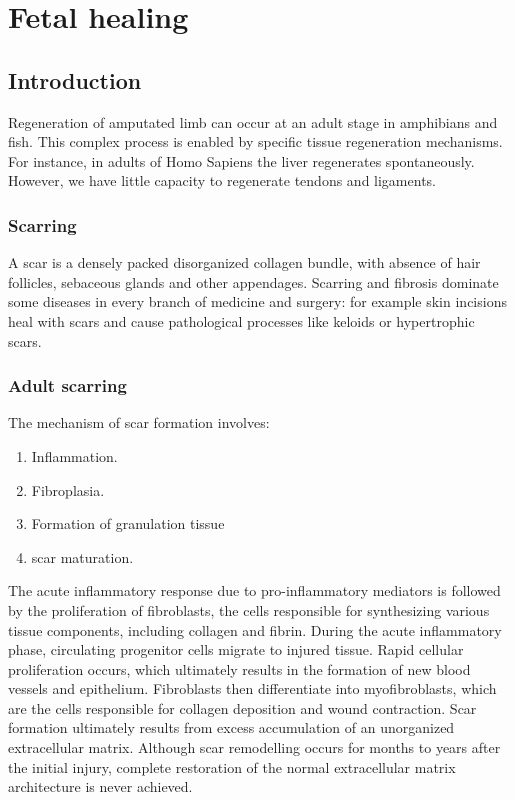 \graphicspath{{chapters/07/images/}}
\chapter{Fetal healing}

\section{Introduction}
Regeneration of amputated limb can occur at an adult stage in amphibians and fish.
This complex process is enabled by specific tissue regeneration mechanisms.
For instance,  in adults of Homo Sapiens the liver regenerates spontaneously.
However, we have little capacity to regenerate tendons and ligaments.

	\subsection{Scarring}
	A scar is a densely packed disorganized collagen bundle, with absence of hair follicles, sebaceous glands and other appendages.
	Scarring and fibrosis dominate some diseases in every branch of medicine and surgery: for example skin incisions heal with scars and cause pathological processes like keloids or hypertrophic scars.

	\subsection{Adult scarring}
	The mechanism of scar formation involves:

	\begin{multicols}{2}
		\begin{enumerate}
			\item Inflammation.
			\item Fibroplasia.
			\item Formation of granulation tissue
			\item scar maturation.
		\end{enumerate}
	\end{multicols}

	The acute inflammatory response due to pro-inflammatory mediators is followed by the proliferation of fibroblasts, the cells responsible for synthesizing various tissue components, including collagen and fibrin.
	During the acute inflammatory phase, circulating progenitor cells migrate to injured tissue.
	Rapid cellular proliferation occurs, which ultimately results in the formation of new blood vessels and epithelium.
	Fibroblasts then differentiate into myofibroblasts, which are the cells responsible for collagen deposition and wound contraction.
	Scar formation ultimately results from excess accumulation of an unorganized extracellular matrix.
	Although scar remodelling occurs for months to years after the initial injury, complete restoration of the normal extracellular matrix architecture is never achieved.

